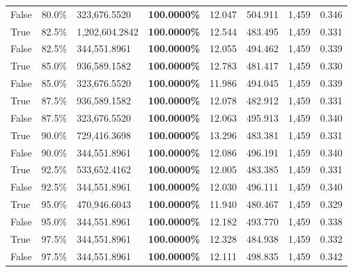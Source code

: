 \begin{table}[H]
\begin{tabular}{lllrllll}
\cline{1-8}
False & 80.0\% & 323,676.5520 & \bfseries \color{red} 100.0000\% & 12.047 & 504.911 & 1,459 & 0.346 \\
\cline{1-8}
True & 82.5\% & 1,202,604.2842 & \bfseries \color{red} 100.0000\% & 12.544 & 483.495 & 1,459 & 0.331 \\
\cline{1-8}
False & 82.5\% & 344,551.8961 & \bfseries \color{red} 100.0000\% & 12.055 & 494.462 & 1,459 & 0.339 \\
\cline{1-8}
True & 85.0\% & 936,589.1582 & \bfseries \color{red} 100.0000\% & 12.783 & 481.417 & 1,459 & 0.330 \\
\cline{1-8}
False & 85.0\% & 323,676.5520 & \bfseries \color{red} 100.0000\% & 11.986 & 494.045 & 1,459 & 0.339 \\
\cline{1-8}
True & 87.5\% & 936,589.1582 & \bfseries \color{red} 100.0000\% & 12.078 & 482.912 & 1,459 & 0.331 \\
\cline{1-8}
False & 87.5\% & 323,676.5520 & \bfseries \color{red} 100.0000\% & 12.063 & 495.913 & 1,459 & 0.340 \\
\cline{1-8}
True & 90.0\% & 729,416.3698 & \bfseries \color{red} 100.0000\% & 13.296 & 483.381 & 1,459 & 0.331 \\
\cline{1-8}
False & 90.0\% & 344,551.8961 & \bfseries \color{red} 100.0000\% & 12.086 & 496.191 & 1,459 & 0.340 \\
\cline{1-8}
True & 92.5\% & 533,652.4162 & \bfseries \color{red} 100.0000\% & 12.005 & 483.385 & 1,459 & 0.331 \\
\cline{1-8}
False & 92.5\% & 344,551.8961 & \bfseries \color{red} 100.0000\% & 12.030 & 496.111 & 1,459 & 0.340 \\
\cline{1-8}
True & 95.0\% & 470,946.6043 & \bfseries \color{red} 100.0000\% & 11.940 & 480.467 & 1,459 & 0.329 \\
\cline{1-8}
False & 95.0\% & 344,551.8961 & \bfseries \color{red} 100.0000\% & 12.182 & 493.770 & 1,459 & 0.338 \\
\cline{1-8}
True & 97.5\% & 344,551.8961 & \bfseries \color{red} 100.0000\% & 12.328 & 484.938 & 1,459 & 0.332 \\
\cline{1-8}
False & 97.5\% & 344,551.8961 & \bfseries \color{red} 100.0000\% & 12.111 & 498.835 & 1,459 & 0.342 \\
\cline{1-8}
\bottomrule
\end{tabular}
\end{table}
